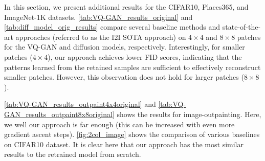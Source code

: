 In this section, we present additional results for the CIFAR10, Places365, and ImageNet-1K datasets. \cref{tab:VQ-GAN_results_original} and \cref{tab:diff_model_orig_results} compare several baseline methods and state-of-the-art approaches (referred to as the I2I SOTA approach) on $4\times4$ and $8\times8$ patches for the VQ-GAN and diffusion models, respectively. Interestingly, for smaller patches ($4\times4$), our approach achieves lower FID scores, indicating that the patterns learned from the retained samples are sufficient to effectively reconstruct smaller patches. However, this observation does not hold for larger patches ($8\times8$).

\cref{tab:VQ-GAN_results_outpaint4x4original} and \cref{tab:VQ-GAN_results_outpaint8x8original} shows the results for image-outpainting. Here, we well our approach is far enough (this can be increased with even more gradient ascent steps). \cref{fig:2col_image} shows the comparison of various baselines on CIFAR10 dataset. It is clear here that our approach has the most similar results to the retrained model from scratch.


